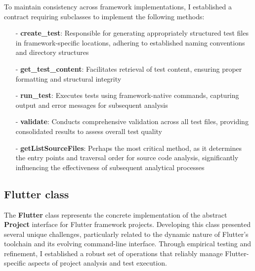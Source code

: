 To maintain consistency across framework implementations, I established a contract requiring subclasses to implement the following methods:
    \begin{itemize}
        \item[-] \textbf{create\_test}: Responsible for generating appropriately structured test files in framework-specific locations, adhering to established naming conventions and directory structures
        \item[-] \textbf{get\_test\_content}: Facilitates retrieval of test content, ensuring proper formatting and structural integrity
        \item[-] \textbf{run\_test}: Executes tests using framework-native commands, capturing output and error messages for subsequent analysis
        \item[-] \textbf{validate}: Conducts comprehensive validation across all test files, providing consolidated results to assess overall test quality
        \item[-] \textbf{getListSourceFiles}: Perhaps the most critical method, as it determines the entry points and traversal order for source code analysis, significantly influencing the effectiveness of subsequent analytical processes
    \end{itemize}


\subsection{Flutter class}

The \textbf{Flutter} class represents the concrete implementation of the abstract \textbf{Project} interface for Flutter framework projects. Developing this class presented several unique challenges, particularly related to the dynamic nature of Flutter's toolchain and its evolving command-line interface. Through empirical testing and refinement, I established a robust set of operations that reliably manage Flutter-specific aspects of project analysis and test execution.

